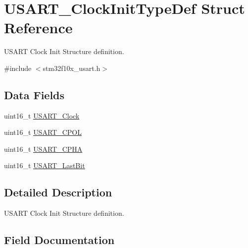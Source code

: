 \hypertarget{struct_u_s_a_r_t___clock_init_type_def}{}\section{U\+S\+A\+R\+T\+\_\+\+Clock\+Init\+Type\+Def Struct Reference}
\label{struct_u_s_a_r_t___clock_init_type_def}


U\+S\+A\+RT Clock Init Structure definition.  




{\ttfamily \#include $<$stm32f10x\+\_\+usart.\+h$>$}

\subsection*{Data Fields}
\begin{DoxyCompactItemize}
\item 
uint16\+\_\+t \mbox{\hyperlink{struct_u_s_a_r_t___clock_init_type_def_a17b0a201922d9d4bad57583b9766904a}{U\+S\+A\+R\+T\+\_\+\+Clock}}
\item 
uint16\+\_\+t \mbox{\hyperlink{struct_u_s_a_r_t___clock_init_type_def_ab6507c7489a2e05e4ef1ade9fbf057d5}{U\+S\+A\+R\+T\+\_\+\+C\+P\+OL}}
\item 
uint16\+\_\+t \mbox{\hyperlink{struct_u_s_a_r_t___clock_init_type_def_ae8d00e2e6f99439097a1b56cd33dd9f4}{U\+S\+A\+R\+T\+\_\+\+C\+P\+HA}}
\item 
uint16\+\_\+t \mbox{\hyperlink{struct_u_s_a_r_t___clock_init_type_def_a998735e29b6f77d3e993d8d34c74cbca}{U\+S\+A\+R\+T\+\_\+\+Last\+Bit}}
\end{DoxyCompactItemize}


\subsection{Detailed Description}
U\+S\+A\+RT Clock Init Structure definition. 



\subsection{Field Documentation}
\mbox{\label{struct_u_s_a_r_t___clock_init_type_def_a17b0a201922d9d4bad57583b9766904a}} 
